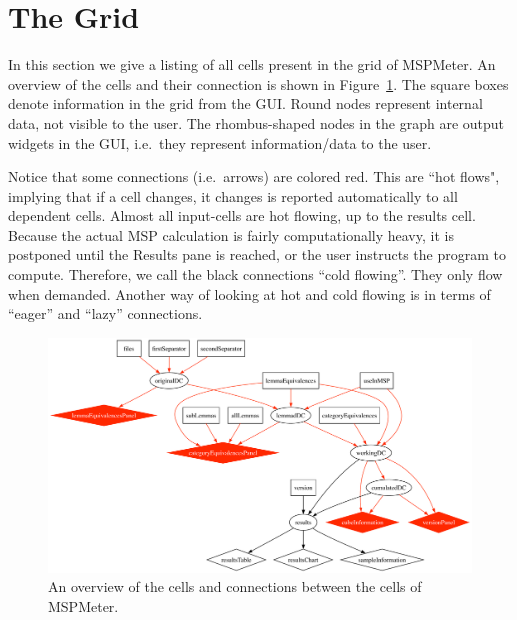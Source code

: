 \documentclass{article}
\begin{document}
\section{The Grid}

In this section we give a listing of all cells present in the grid of MSPMeter. An overview of the cells and their connection is shown in Figure~\ref{fig:cells}. The square boxes denote information in the grid from the GUI. Round nodes represent internal data, not visible to the user. The rhombus-shaped nodes in the graph are  output widgets in the GUI, i.e.\ they represent information/data to the user. 

Notice that some connections (i.e.\ arrows) are colored red. This are ``hot flows", implying that if a cell changes, it changes is reported automatically to all dependent cells. Almost all input-cells are hot flowing, up to the results cell. Because the actual MSP calculation is fairly computationally heavy, it is postponed until the Results pane is reached, or the user instructs the program to compute. Therefore, we call the black connections ``cold flowing''. They only flow when demanded. Another way of looking at hot and cold flowing is in terms of ``eager'' and ``lazy'' connections.

\begin{figure}[t]
	\begin{center}
	\includegraphics[scale=0.3]{dataflow}
	\caption{An overview of the cells and connections between the cells of MSPMeter.  \label{fig:cells}}
	\end{center}
\end{figure}
\end{document}
